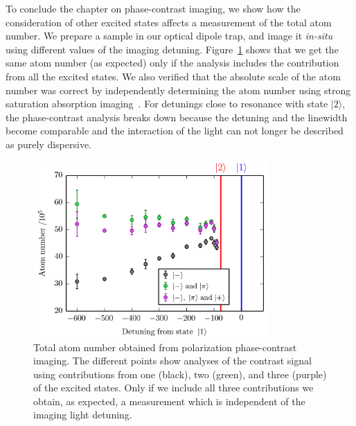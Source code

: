 To conclude the chapter on phase-contrast imaging, we show how the
consideration of other excited states affects a measurement of  the total atom
number.  We prepare a sample in our optical dipole trap, and image it
\textit{in-situ} using different values of the imaging detuning.
Figure~\ref{fig:phc-number} shows that we get the same atom number (as
expected) only if the analysis includes the contribution from all the excited
states.  We also verified that the absolute scale of the atom number was
correct by independently determining the atom number using strong saturation
absorption imaging~\cite{reinaudi2007strong}.   For detunings close to
resonance with state $|2\rangle$, the phase-contrast analysis breaks down
because the detuning and the linewidth become comparable and the interaction of
the light can not longer be described as purely dispersive.
\begin{figure}
\centering
\includegraphics[width=0.8\textwidth]{../figures/phasecon/phc-numberVSdet_thesis.png}
\caption[Phase-contrast imaging vs. detuning]{Total atom number obtained from
polarization phase-contrast imaging.  The different points show analyses of the
contrast signal using contributions from one (black), two (green), and three
(purple) of the excited states.  Only if we include all three contributions we
obtain, as expected, a measurement which is independent of the imaging light
detuning. }
\label{fig:phc-number}
\end{figure}


